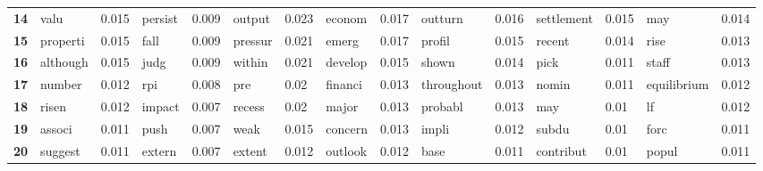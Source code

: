 \begin{tabular}{|l|l|l||l|l||l|l||l|l||l|l||l|l||l|l||}
\textbf{14} &  valu &  0.015 &  persist &  0.009 &  output &  0.023 &  econom &  0.017 &  outturn &  0.016 &  settlement &  0.015 &  may &  0.014 \\
\textbf{15} &  properti &  0.015 &  fall &  0.009 &  pressur &  0.021 &  emerg &  0.017 &  profil &  0.015 &  recent &  0.014 &  rise &  0.013 \\
\textbf{16} &  although &  0.015 &  judg &  0.009 &  within &  0.021 &  develop &  0.015 &  shown &  0.014 &  pick &  0.011 &  staff &  0.013 \\
\textbf{17} &  number &  0.012 &  rpi &  0.008 &  pre &  0.02 &  financi &  0.013 &  throughout &  0.013 &  nomin &  0.011 &  equilibrium &  0.012 \\
\textbf{18} &  risen &  0.012 &  impact &  0.007 &  recess &  0.02 &  major &  0.013 &  probabl &  0.013 &  may &  0.01 &  lf &  0.012 \\
\textbf{19} &  associ &  0.011 &  push &  0.007 &  weak &  0.015 &  concern &  0.013 &  impli &  0.012 &  subdu &  0.01 &  forc &  0.011 \\
\textbf{20} &  suggest &  0.011 &  extern &  0.007 &  extent &  0.012 &  outlook &  0.012 &  base &  0.011 &  contribut &  0.01 &  popul &  0.011 \\
\bottomrule
\end{tabular}
